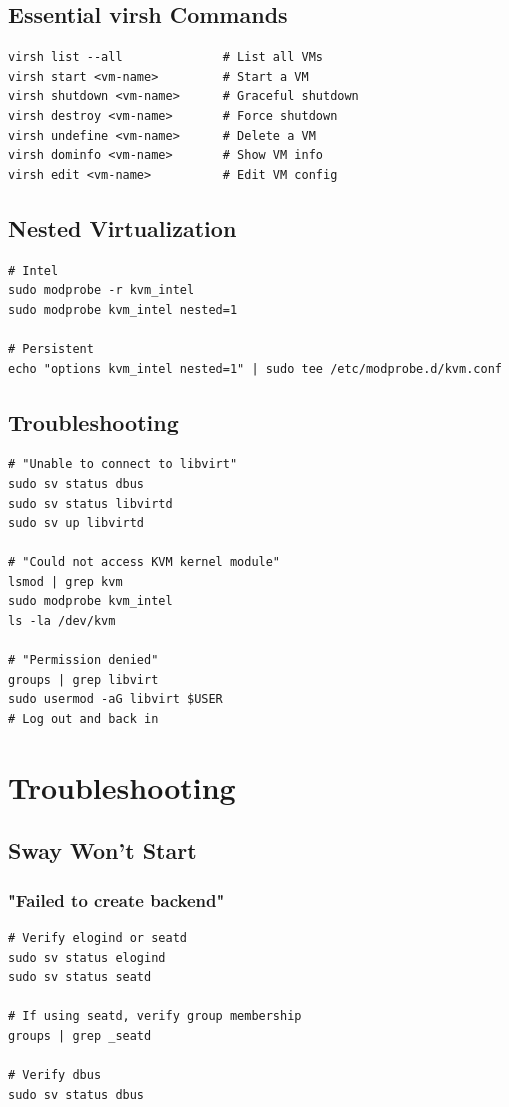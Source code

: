 \documentclass[12pt, a4paper]{book}
\begin{document}
\section{Essential virsh Commands}
\begin{lstlisting}
virsh list --all              # List all VMs
virsh start <vm-name>         # Start a VM
virsh shutdown <vm-name>      # Graceful shutdown
virsh destroy <vm-name>       # Force shutdown
virsh undefine <vm-name>      # Delete a VM
virsh dominfo <vm-name>       # Show VM info
virsh edit <vm-name>          # Edit VM config
\end{lstlisting}

\section{Nested Virtualization}
\begin{lstlisting}
# Intel
sudo modprobe -r kvm_intel
sudo modprobe kvm_intel nested=1

# Persistent
echo "options kvm_intel nested=1" | sudo tee /etc/modprobe.d/kvm.conf
\end{lstlisting}

\section{Troubleshooting}
\begin{lstlisting}
# "Unable to connect to libvirt"
sudo sv status dbus
sudo sv status libvirtd
sudo sv up libvirtd

# "Could not access KVM kernel module"
lsmod | grep kvm
sudo modprobe kvm_intel
ls -la /dev/kvm

# "Permission denied"
groups | grep libvirt
sudo usermod -aG libvirt $USER
# Log out and back in
\end{lstlisting}

\chapter{Troubleshooting}

\section{Sway Won't Start}

\subsection{"Failed to create backend"}
\begin{lstlisting}
# Verify elogind or seatd
sudo sv status elogind
sudo sv status seatd

# If using seatd, verify group membership
groups | grep _seatd

# Verify dbus
sudo sv status dbus
\end{lstlisting}
\end{document}
